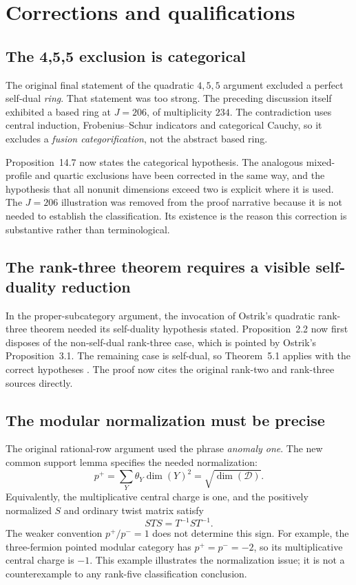 \documentclass[11pt,a4paper]{article}
\newcommand{\issue}[1]{\subsection{#1}}
\begin{document}
\section{Corrections and qualifications}

\issue{The 4,5,5 exclusion is categorical}

The original final statement of the quadratic \(4,5,5\) argument excluded
a perfect self-dual \emph{ring}. That statement was too strong. The
preceding discussion itself exhibited a based ring at \(J=206\), of
multiplicity \(234\). The contradiction uses central induction,
Frobenius--Schur indicators and categorical Cauchy, so it excludes a
\emph{fusion categorification}, not the abstract based ring.

Proposition~14.7 now states the categorical hypothesis. The analogous
mixed-profile and quartic exclusions have been corrected in the same
way, and the hypothesis that all nonunit dimensions exceed two is
explicit where it is used. The \(J=206\) illustration was removed from
the proof narrative because it is not needed to establish the classification.
Its existence is the reason this correction is substantive rather than
terminological.

\issue{The rank-three theorem requires a visible self-duality reduction}

In the proper-subcategory argument, the invocation of Ostrik's quadratic
rank-three theorem needed its self-duality hypothesis stated.
Proposition~2.2 now first disposes of the non-self-dual rank-three case,
which is pointed by Ostrik's Proposition~3.1. The remaining case is
self-dual, so Theorem~5.1 applies with the correct hypotheses
\cite{Ostrik3}. The proof now cites the original rank-two and rank-three
sources directly.

\issue{The modular normalization must be precise}

The original rational-row argument used the phrase \emph{anomaly one}.
The new common support lemma specifies the needed normalization:
\[
 p^+=\sum_Y\theta_Y\dim(Y)^2=\sqrt{\dim(\mathcal D)}.
\]
Equivalently, the multiplicative central charge is one, and the positively
normalized \(S\) and ordinary twist matrix satisfy
\[
 STS=T^{-1}ST^{-1}.
\]
The weaker convention \(p^+/p^-=1\) does not determine this sign.
For example, the three-fermion pointed modular category has
\(p^+=p^-=-2\), so its multiplicative central charge is \(-1\).
This example illustrates the normalization issue; it is not a
counterexample to any rank-five classification conclusion.
\end{document}
